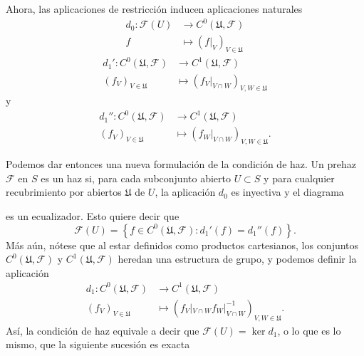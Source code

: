 \documentclass[autocontact]{gaceta}
\theoremstyle{definition} \newtheorem{defn}[thm]{Definición}
\theoremstyle{definition} \newtheorem{ejemplo}[thm]{Ejemplo}
\theoremstyle{definition} \newtheorem{ejercicio}[thm]{Ejercicio}
\def\FF{\mathscr{F}}
\def\UU{\mathfrak{U}}
\begin{document}
  Ahora, las aplicaciones de restricción inducen aplicaciones naturales
  \begin{align*}
    d_0 :\FF(U)&\longrightarrow C^0(\UU,\FF)\\ 
    f &\longmapsto (f|_V)_{V\in \UU}
    \end{align*}
    \begin{align*}
      d_1' :C^0(\UU,\FF)&\longrightarrow C^1(\UU,\FF)\\ 
      (f_V)_{V\in \UU} &\longmapsto (f_V|_{V\cap W})_{V,W \in \UU}
      \end{align*}
      y
    \begin{align*}
      d_1'' :C^0(\UU,\FF)&\longrightarrow C^1(\UU,\FF)\\ 
      (f_V)_{V\in \UU} &\longmapsto (f_W|_{V\cap W})_{V,W \in \UU}.
      \end{align*}

  Podemos dar entonces una nueva formulación de la condición de haz. Un prehaz $\FF$ en $S$ es un haz si, para cada subconjunto abierto $U\subset S$ y para cualquier recubrimiento por abiertos $\UU$ de $U$, la aplicación $d_0$ es inyectiva y el diagrama
  \begin{center}
  \end{center}
  es un ecualizador. Esto quiere decir que
  \begin{equation*}
    \FF(U)=\left\{ f\in C^0(\UU,\FF) : d_1'(f) = d_1''(f) \right\}.
  \end{equation*}
  Más aún, nótese que al estar definidos como productos cartesianos, los conjuntos $C^0(\UU,\FF)$ y $C^1(\UU,\FF)$ heredan una estructura de grupo, y podemos definir la aplicación
  \begin{align*}
    d_1 :C^0(\UU,\FF)&\longrightarrow C^1(\UU,\FF)\\ 
    (f_V)_{V\in \UU} &\longmapsto (f_V|_{V\cap W} f_W|_{V\cap W}^{-1})_{V,W \in \UU}. 
    \end{align*}
    Así, la condición de haz equivale a decir que $\FF(U)= \ker d_1$, o lo que es lo mismo, que la siguiente sucesión es exacta
    \begin{center}
    \end{center}
\end{document}
